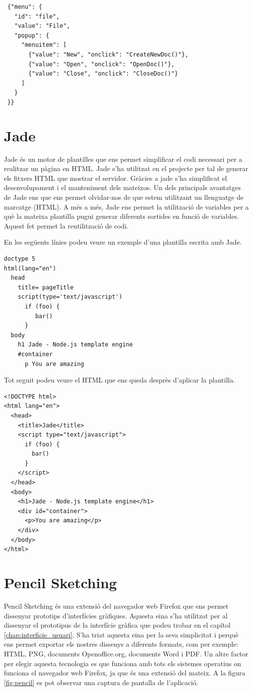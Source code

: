 \begin{lstlisting}
 {"menu": {
   "id": "file",
   "value": "File",
   "popup": {
     "menuitem": [
       {"value": "New", "onclick": "CreateNewDoc()"},
       {"value": "Open", "onclick": "OpenDoc()"},
       {"value": "Close", "onclick": "CloseDoc()"}
     ]
   }
 }}
\end{lstlisting}


\section{Jade}

Jade és un motor de plantilles que ens permet simplificar el codi necessari per a realitzar un pàgina en HTML. Jade s'ha utilitzat en el projecte per tal de generar els fitxers HTML que mostrar el servidor. Gràcies a jade s'ha simplificat el desenvolupament i el manteniment dels mateixos. Un dels principals avantatges de Jade ens que ens permet olvidar-nos de que estem utilitzant un llenguatge de marcatge (HTML). A més a més, Jade ens permet la utilització de variables per a què la mateixa plantilla pugui generar diferents sortides en funció de variables. Aquest fet permet la reutilització de codi.

En les següents línies podeu veure un exemple d'una plantilla escrita amb Jade. 

\begin{lstlisting}
doctype 5
html(lang="en")
  head
    title= pageTitle
    script(type='text/javascript')
      if (foo) {
         bar()
      }
  body
    h1 Jade - Node.js template engine
    #container
      p You are amazing
\end{lstlisting}

Tot seguit podeu veure el HTML que ens queda desprès d'aplicar la plantilla. 

\begin{lstlisting}
<!DOCTYPE html>
<html lang="en">
  <head>
    <title>Jade</title>
    <script type="text/javascript">
      if (foo) {
        bar()
      }
    </script>
  </head>
  <body>
    <h1>Jade - Node.js template engine</h1>
    <div id="container">
      <p>You are amazing</p>
    </div>
  </body>
</html>	
\end{lstlisting}

\section{Pencil Sketching}
\label{sec:pencil sketcing}
Pencil Sketching és una extensió del navegador web Firefox que ens permet dissenyar prototips d'interfícies gràfiques. Aquesta eina s'ha utilitzat per al dissenyar el prototipus de la interfície gràfica que podeu trobar en el capítol \ref{chap:interficie_usuari}. S'ha triat aquesta eina per la seva simplicitat i perquè ens permet exportar els nostres dissenys a diferents formats, com per exemple: HTML, PNG, documents Openoffice.org, documents Word i PDF. Un altre factor per elegir aquesta tecnologia es que funciona amb tots els sistemes operatius on funciona el navegador web Firefox, ja que és una extensió del mateix. A la figura \ref{fig:pencil} es pot observar una captura de pantalla de l'aplicació. 

